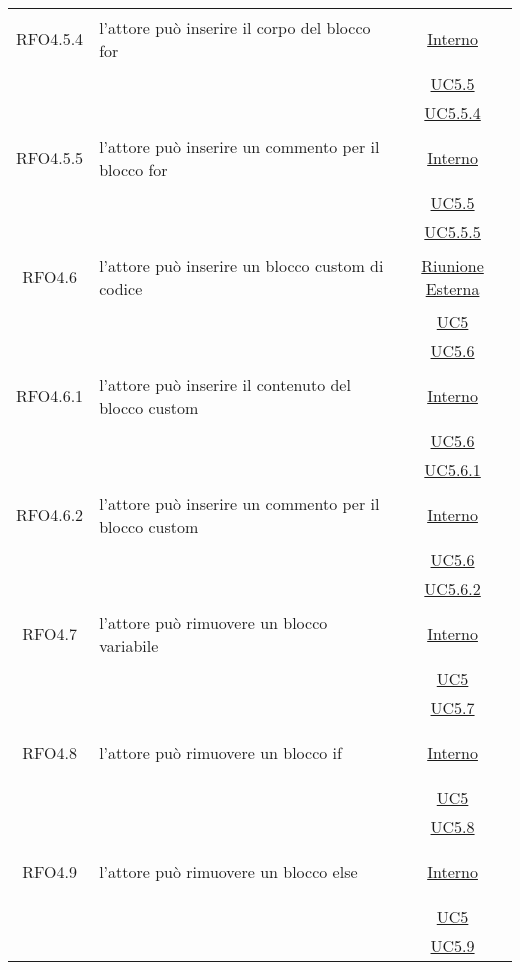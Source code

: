 \begin{longtable}{|c|>{\centering}m{7cm}|c|}
\hypertarget{RFO4.5.4}{RFO4.5.4} & l'attore può inserire il corpo del blocco for &\hyperlink{Interno}{Interno}\\
& &\hyperref[UC5.5]{UC5.5}\\
& &\hyperref[UC5.5.4]{UC5.5.4}\\ \hline

\hypertarget{RFO4.5.5}{RFO4.5.5} & l'attore può inserire un commento per il blocco for & \hyperlink{Interno}{Interno}\\
& &\hyperref[UC5.5]{UC5.5}\\
& &\hyperref[UC5.5.5]{UC5.5.5}\\ \hline

\hypertarget{RFO4.6}{RFO4.6} & l'attore può inserire un blocco custom di codice & \hyperlink{Riunione Esterna}{Riunione Esterna}\\
& &\hyperref[UC5]{UC5}\\
& &\hyperref[UC5.6]{UC5.6}\\ \hline

\hypertarget{RFO4.6.1}{RFO4.6.1} & l'attore può inserire il contenuto del blocco custom & \hyperlink{Interno}{Interno}\\
& &\hyperref[UC5.6]{UC5.6}\\
& &\hyperref[UC5.6.1]{UC5.6.1}\\ \hline

\hypertarget{RFO4.6.2}{RFO4.6.2} & l'attore può inserire un commento per il blocco custom & \hyperlink{Interno}{Interno}\\
& &\hyperref[UC5.6]{UC5.6}\\
& &\hyperref[UC5.6.2]{UC5.6.2}\\ \hline

\hypertarget{RFO4.7}{RFO4.7} & l'attore può rimuovere un blocco variabile &\hyperlink{Interno}{Interno}\\
& &\hyperref[UC5]{UC5}\\
& &\hyperref[UC5.7]{UC5.7}\\ \hline

\hypertarget{RFO4.8}{RFO4.8} & l'attore può rimuovere un blocco if & \hyperlink{Interno}{Interno}\\
& &\hyperref[UC5]{UC5}\\
& &\hyperref[UC5.8]{UC5.8}\\ \hline

\hypertarget{RFO4.9}{RFO4.9} & l'attore può rimuovere un blocco else & \hyperlink{Interno}{Interno}\\
& &\hyperref[UC5]{UC5}\\
& &\hyperref[UC5.9]{UC5.9}\\ \hline


\end{longtable}
